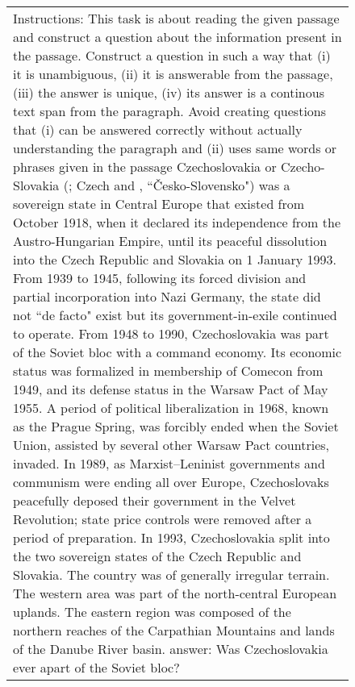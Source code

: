 \begin{figure}[h]
\centering
\begin{tabular}{p{}}
\cellcolor{oldlace} Instructions: This task is about reading the given passage and construct a question about the information present in the passage. Construct a question in such a way that (i) it is unambiguous, (ii) it is answerable from the passage, (iii) the answer is unique, (iv) its answer is a continous text span from the paragraph. Avoid creating questions that (i) can be answered correctly without actually understanding the paragraph and (ii) uses same words or phrases given in the passage \vspace{1pt} \newline Czechoslovakia or Czecho-Slovakia (; Czech and , ``Česko-Slovensko") was a sovereign state in Central Europe that existed from October 1918, when it declared its independence from the Austro-Hungarian Empire, until its peaceful dissolution into the Czech Republic and Slovakia on 1 January 1993. \vspace{1pt} \newline \vspace{1pt} \newline From 1939 to 1945, following its forced division and partial incorporation into Nazi Germany, the state did not ``de facto" exist but its government-in-exile continued to operate. \vspace{1pt} \newline \vspace{1pt} \newline From 1948 to 1990, Czechoslovakia was part of the Soviet bloc with a command economy. Its economic status was formalized in membership of Comecon from 1949, and its defense status in the Warsaw Pact of May 1955. A period of political liberalization in 1968, known as the Prague Spring, was forcibly ended when the Soviet Union, assisted by several other Warsaw Pact countries, invaded. In 1989, as Marxist–Leninist governments and communism were ending all over Europe, Czechoslovaks peacefully deposed their government in the Velvet Revolution; state price controls were removed after a period of preparation. In 1993, Czechoslovakia split into the two sovereign states of the Czech Republic and Slovakia. \vspace{1pt} \newline \vspace{1pt} \newline \vspace{1pt} \newline \vspace{1pt} \newline The country was of generally irregular terrain. The western area was part of the north-central European uplands. The eastern region was composed of the northern reaches of the Carpathian Mountains and lands of the Danube River basin.\vspace{1pt} \newline answer: \textcolor{cadmiumgreen}{Was Czechoslovakia ever apart of the Soviet bloc?} \\

\end{tabular}
\end{figure}
